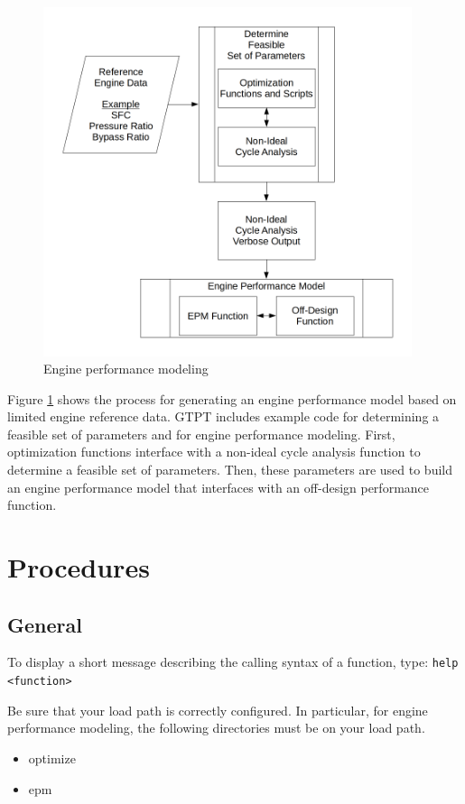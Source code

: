 \documentclass{article}
\begin{document}
\begin{figure}[h]
  \centering
  \includegraphics[width=4.25in]{figure-epm-flowchart.png}
  \caption{Engine performance modeling}
  \label{fig:epm}
\end{figure}

Figure \ref{fig:epm} shows the process for generating an engine
performance model based on limited engine reference data.  GTPT
includes example code for determining a feasible set of parameters and
for engine performance modeling.  First, optimization functions
interface with a non-ideal cycle analysis function to determine a
feasible set of parameters.  Then, these parameters are used to build
an engine performance model that interfaces with an off-design
performance function.

\section{Procedures}
\subsection{General}
To display a short message describing the calling syntax of a
function, type:
\newline
\newline
\texttt{help <function>}
\newline
\newline

Be sure that your load path is correctly configured.  In particular,
for engine performance modeling, the following directories must be on
your load path.
\begin{itemize}
\item optimize
\item epm
\end{itemize}
\end{document}
